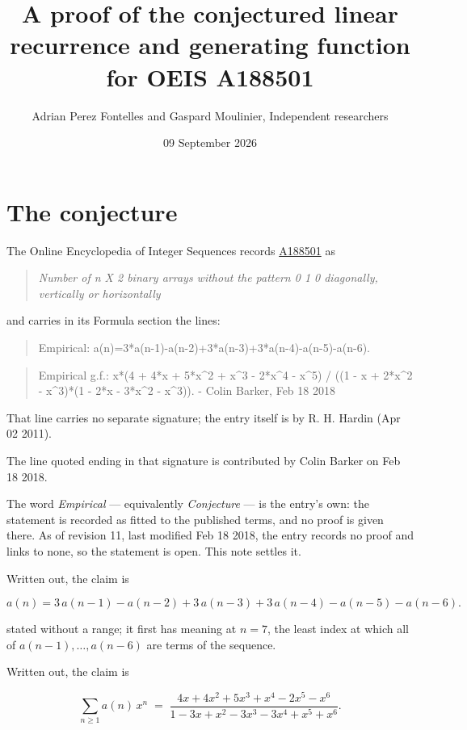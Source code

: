 \documentclass[11pt]{article}
\title{A proof of the conjectured linear recurrence and generating function for OEIS A188501}
\author{Adrian Perez Fontelles and Gaspard Moulinier, Independent researchers}
\date{09 September 2026}
\theoremstyle{definition}
\begin{document}
\maketitle
\section{The conjecture}

The Online Encyclopedia of Integer Sequences records \href{https://oeis.org/A188501}{A188501} as

\begin{quote}\itshape Number of n X 2 binary arrays without the pattern 0 1 0 diagonally, vertically or horizontally\end{quote}

and carries in its Formula section the lines:

\begin{quote}\ttfamily Empirical: a(n)=3*a(n-1)-a(n-2)+3*a(n-3)+3*a(n-4)-a(n-5)-a(n-6).\end{quote}

\begin{quote}\ttfamily Empirical g.f.: x*(4 + 4*x + 5*x\textasciicircum{}2 + x\textasciicircum{}3 - 2*x\textasciicircum{}4 - x\textasciicircum{}5) / ((1 - x + 2*x\textasciicircum{}2 - x\textasciicircum{}3)*(1 - 2*x - 3*x\textasciicircum{}2 - x\textasciicircum{}3)). - Colin Barker, Feb 18 2018\end{quote}

That line carries no separate signature; the entry itself is by R. H. Hardin (Apr 02 2011).

The line quoted ending in that signature is contributed by Colin Barker on Feb 18 2018.

The word {\itshape Empirical} --- equivalently {\itshape Conjecture} --- is the entry's own: the statement is recorded as fitted to the published terms, and no proof is given there. As of revision 11, last modified Feb 18 2018, the entry records no proof and links to none, so the statement is open. This note settles it.

Written out, the claim is

\[a(n) = 3\,a(n-1) - a(n-2) + 3\,a(n-3) + 3\,a(n-4) - a(n-5) - a(n-6).\]

stated without a range; it first has meaning at $n = 7$, the least index at which all of $a(n-1),\dots,a(n-6)$ are terms of the sequence.

Written out, the claim is

\[\sum_{n \ge 1} a(n)\,x^n \;=\; \frac{4x + 4x^{2} + 5x^{3} + x^{4} - 2x^{5} - x^{6}}{1 - 3x + x^{2} - 3x^{3} - 3x^{4} + x^{5} + x^{6}}.\]
\end{document}
